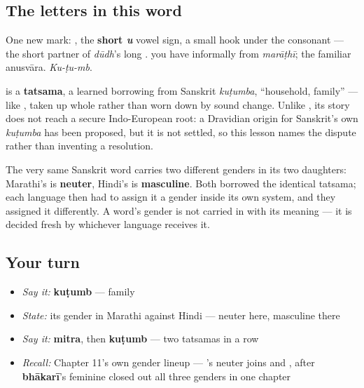 \subsection*{The letters in this word}
One new mark: \textbf{}, the \textbf{short \emph{u}} vowel sign, a small hook under the consonant — the short partner of \emph{dūdh}'s long \textbf{}. \textbf{} you have informally from \emph{marāṭhī}; \textbf{} the familiar anusvāra. \emph{Ku-ṭu-mb}.

\begin{cousinweb}
\textbf{} is a \textbf{tatsama}, a learned borrowing from Sanskrit \textbf{} \emph{kuṭumba}, \textquotedblleft{}household, family\textquotedblright{} — like \textbf{}, taken up whole rather than worn down by sound change. Unlike \textbf{}, its story does not reach a secure Indo-European root: a Dravidian origin for Sanskrit's own \emph{kuṭumba} has been proposed, but it is not settled, so this lesson names the dispute rather than inventing a resolution.
\end{cousinweb}

\begin{grammarlens}[title={Grammar Lens: a gender Hindi disagrees with}]
The very same Sanskrit word carries two different genders in its two daughters: Marathi's \textbf{} is \textbf{neuter}, Hindi's \textbf{} is \textbf{masculine}. Both borrowed the identical tatsama; each language then had to assign it a gender inside its own system, and they assigned it differently. A word's gender is not carried in with its meaning — it is decided fresh by whichever language receives it.
\end{grammarlens}

\subsection*{Your turn}
\begin{itemize}
\raggedright
  \item \emph{Say it:} \textbf{kuṭumb} — family
  \item \emph{State:} its gender in Marathi against Hindi — neuter here, masculine there
  \item \emph{Say it:} \textbf{mitra}, then \textbf{kuṭumb} — two tatsamas in a row
  \item \emph{Recall:} Chapter 11's own gender lineup — \textbf{}'s neuter joins \textbf{} and \textbf{}, after \textbf{bhākarī}'s feminine closed out all three genders in one chapter
\end{itemize}

